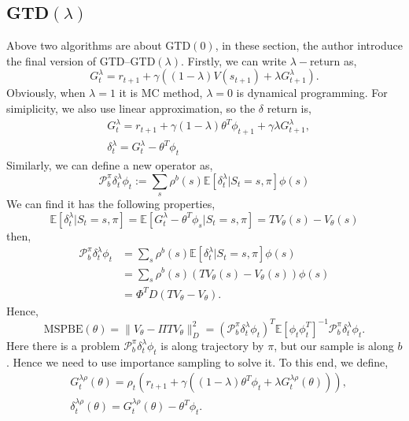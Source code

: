 \documentclass[11pt,a4paper]{article}
\def\P{{\mathcal P}}
\def\P{{\mathcal P}}
\def\E{\mathbb{E}}
\def\Pi{\varPi}
\begin{document}
\subsection{GTD$(\lambda)$}
Above two algorithms are about GTD$(0)$, in these section, the author introduce the final version of GTD--GTD$(\lambda)$\cite{maei2011gradient}. Firstly, we can write $\lambda-$return as,
\begin{equation}
G_t^{\lambda} = r_{t+1} + \gamma\left((1-\lambda)V(s_{t+1})+\lambda G_{t+1}^{\lambda}\right).
\end{equation}
Obviously, when $\lambda=1$ it is MC method, $\lambda=0$ is dynamical programming. For simiplicity, we also use linear approximation, so the $\delta$ return is,
\begin{align}
& G_t^\lambda = r_{t+1} + \gamma(1-\lambda) \theta^T\phi_{t+1} + \gamma \lambda G_{t+1}^{\lambda},\\
& \delta_t^{\lambda} = G_{t}^\lambda - \theta^T\phi_t
\end{align}
Similarly, we can define a new operator as,
\begin{equation}
\P_{b}^{\pi}\delta_t^{\lambda}\phi_t := \sum_s \rho^b(s)\E[\delta_t^\lambda|S_t=s,\pi]\phi(s)
\end{equation}
We can find it has the following properties,
\begin{equation}
\E[\delta_t^\lambda|S_t=s,\pi] = \E[G_{t}^{\lambda}-\theta^T\phi_s|S_t=s,\pi] = TV_{\theta}(s) - V_{\theta}(s)
\end{equation}
then,
\begin{align}
\P_{b}^{\pi}\delta_t^{\lambda}\phi_t &= \sum_s \rho^b(s)\E[\delta_t^\lambda|S_t=s,\pi]\phi(s)\\ 
& = \sum_s \rho^b(s)(TV_{\theta}(s)-V_{\theta}(s))\phi(s) \\ 
& = \Phi^T D (TV_{\theta}-V_{\theta}).
\end{align}
Hence,
\begin{equation}
\mathrm{MSPBE}(\theta) = \|V_{\theta} - \Pi TV_{\theta}\|_D^2 = (\P_{b}^{\pi}\delta_t^\lambda \phi_t)^T \E[\phi_t\phi_t^T]^{-1}\P_{b}^{\pi}\delta_t^\lambda \phi_t.
\end{equation}
Here there is a problem $\P_{b}^{\pi}\delta_t^\lambda \phi_t$ is along trajectory by $\pi$, but our sample is along $b$. Hence we need to use importance sampling to solve it. To this end, we define,
\begin{align}
& G_{t}^{\lambda\rho}(\theta) = \rho_t(r_{t+1}+\gamma((1-\lambda)\theta^T\phi_t + \lambda G_{t}^{\lambda\rho}(\theta))),\\ 
& \delta_{t}^{\lambda \rho}(\theta) = G_t^{\lambda \rho}(\theta) - \theta^T\phi_t.
\end{align}
\end{document}
